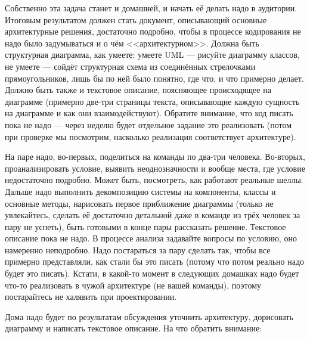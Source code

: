 \documentclass[a5paper]{article}
\begin{document}
Собственно эта задача станет и домашней, и начать её делать надо в аудитории. Итоговым результатом должен стать документ, описывающий основные архитектурные решения, достаточно подробно, чтобы в процессе кодирования не надо было задумываться и о чём <<архитектурном>>. Должна быть структурная диаграмма, как умеете: умеете UML --- рисуйте диаграмму классов, не умеете --- сойдёт структурная схема из соединённых стрелочками прямоугольников, лишь бы по ней было понятно, где что, и что примерно делает. Должно быть также и текстовое описание, поясняющее происходящее на диаграмме (примерно две-три страницы текста, описывающие каждую сущность на диаграмме и как они взаимодействуют). Обратите внимание, что код писать пока не надо --- через неделю будет отдельное задание это реализовать (потом при проверке мы посмотрим, насколько реализация соответствует архитектуре).

На паре надо, во-первых, поделиться на команды по два-три человека. Во-вторых, проанализировать условие, выявить неоднозначности и вообще места, где условие недостаточно подробно. Может быть, посмотреть, как работают реальные шеллы. Дальше надо выполнить декомпозицию системы на компоненты, классы и основные методы, нарисовать первое приближение диаграммы (только не увлекайтесь, сделать её достаточно детальной даже в команде из трёх человек за пару не успеть), быть готовыми в конце пары рассказать решение. Текстовое описание пока не надо. В процессе анализа задавайте вопросы по условию, оно намеренно неподробно. Надо постараться за пару сделать так, чтобы все примерно представляли, как стали бы это писать (потому что потом реально надо будет это писать). Кстати, в какой-то момент в следующих домашках надо будет что-то реализовать в чужой архитектуре (не вашей команды), поэтому постарайтесь не халявить при проектировании.

Дома надо будет по результатам обсуждения уточнить архитектуру, дорисовать диаграмму и написать текстовое описание. На что обратить внимание:
\end{document}
